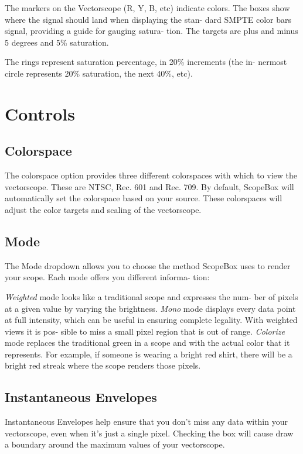 \documentclass[10,letterpaper,]{report}
\begin{document}
The markers on the Vectorscope (R, Y, B, etc) indicate colors. The boxes
show where the signal should land when displaying the stan- dard SMPTE
color bars signal, providing a guide for gauging satura- tion. The
targets are plus and minus 5 degrees and 5\% saturation.

The rings represent saturation percentage, in 20\% increments (the in-
nermost circle represents 20\% saturation, the next 40\%, etc).

\section{Controls}

\subsection{Colorspace}

The colorspace option provides three different colorspaces with which to
view the vectorscope. These are NTSC, Rec. 601 and Rec. 709. By default,
ScopeBox will automatically set the colorspace based on your source.
These colorspaces will adjust the color targets and scaling of the
vectorscope.

\subsection{Mode}

The Mode dropdown allows you to choose the method ScopeBox uses to
render your scope. Each mode offers you different informa- tion:

\emph{Weighted} mode looks like a traditional scope and expresses the
num- ber of pixels at a given value by varying the brightness.
\emph{Mono} mode displays every data point at full intensity, which can
be useful in ensuring complete legality. With weighted views it is pos-
sible to miss a small pixel region that is out of range. \emph{Colorize}
mode replaces the traditional green in a scope and with the actual color
that it represents. For example, if someone is wearing a bright red
shirt, there will be a bright red streak where the scope renders those
pixels.

\subsection{Instantaneous Envelopes}

Instantaneous Envelopes help ensure that you don't miss any data within
your vectorscope, even when it's just a single pixel. Checking the box
will cause draw a boundary around the maximum values of your
vectorscope.
\end{document}
